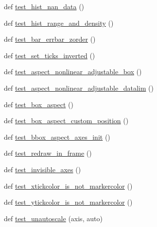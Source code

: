 \begin{DoxyCompactItemize}
\item 
def \hyperlink{namespacematplotlib_1_1tests_1_1test__axes_ae5ce0529772d3c4e83373d607851bf59}{test\+\_\+hist\+\_\+nan\+\_\+data} ()
\item 
def \hyperlink{namespacematplotlib_1_1tests_1_1test__axes_a55cce6f0662a58a4365c2981b942a8d2}{test\+\_\+hist\+\_\+range\+\_\+and\+\_\+density} ()
\item 
def \hyperlink{namespacematplotlib_1_1tests_1_1test__axes_ae7e667b778b47fcbb2c15fa98efd5012}{test\+\_\+bar\+\_\+errbar\+\_\+zorder} ()
\item 
def \hyperlink{namespacematplotlib_1_1tests_1_1test__axes_af88df5eb1280804dcdc3039162b07831}{test\+\_\+set\+\_\+ticks\+\_\+inverted} ()
\item 
def \hyperlink{namespacematplotlib_1_1tests_1_1test__axes_a6c08565281a5af6ed997651676a5faf9}{test\+\_\+aspect\+\_\+nonlinear\+\_\+adjustable\+\_\+box} ()
\item 
def \hyperlink{namespacematplotlib_1_1tests_1_1test__axes_a0c563d2b852d4f9fc04e2248df50a6dc}{test\+\_\+aspect\+\_\+nonlinear\+\_\+adjustable\+\_\+datalim} ()
\item 
def \hyperlink{namespacematplotlib_1_1tests_1_1test__axes_a081108f3a4a8505f310ea570fca9d269}{test\+\_\+box\+\_\+aspect} ()
\item 
def \hyperlink{namespacematplotlib_1_1tests_1_1test__axes_a6a22580c1e5c5b15b456be66e583c0b5}{test\+\_\+box\+\_\+aspect\+\_\+custom\+\_\+position} ()
\item 
def \hyperlink{namespacematplotlib_1_1tests_1_1test__axes_aee000e30994a331edb9de19133134674}{test\+\_\+bbox\+\_\+aspect\+\_\+axes\+\_\+init} ()
\item 
def \hyperlink{namespacematplotlib_1_1tests_1_1test__axes_aa9830289230bad0604cd2ff92fc2827d}{test\+\_\+redraw\+\_\+in\+\_\+frame} ()
\item 
def \hyperlink{namespacematplotlib_1_1tests_1_1test__axes_a921be59e6cbad666ace8df069959a6fa}{test\+\_\+invisible\+\_\+axes} ()
\item 
def \hyperlink{namespacematplotlib_1_1tests_1_1test__axes_a82329dd6f743dc776ec7782559ff9547}{test\+\_\+xtickcolor\+\_\+is\+\_\+not\+\_\+markercolor} ()
\item 
def \hyperlink{namespacematplotlib_1_1tests_1_1test__axes_acace226907336c44fb7d0c58c01f1dd8}{test\+\_\+ytickcolor\+\_\+is\+\_\+not\+\_\+markercolor} ()
\item 
def \hyperlink{namespacematplotlib_1_1tests_1_1test__axes_a4c0b7756a680464b4d407e30675c27e8}{test\+\_\+unautoscale} (axis, auto)

\end{DoxyCompactItemize}
